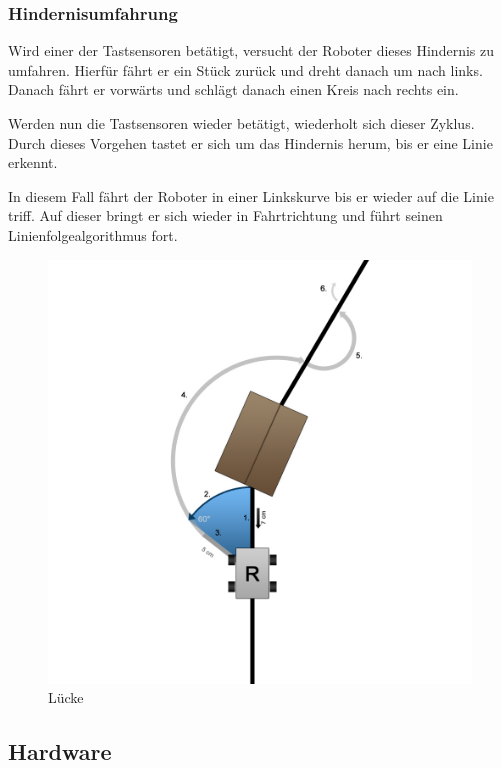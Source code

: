 \documentclass[a4paper]{article}
\begin{document}
\subsubsection{Hindernisumfahrung}
Wird einer der Tastsensoren betätigt, versucht der Roboter dieses
Hindernis zu umfahren. Hierfür fährt er ein Stück zurück und dreht danach
um nach links. Danach fährt er vorwärts und schlägt danach einen Kreis nach rechts
ein.

Werden nun die Tastsensoren wieder betätigt, wiederholt sich dieser
Zyklus. Durch dieses Vorgehen tastet er sich um das Hindernis herum, bis
er eine Linie erkennt.

In diesem Fall fährt der Roboter in einer Linkskurve bis er wieder auf
die Linie triff. Auf dieser bringt er sich wieder in Fahrtrichtung und
führt seinen Linienfolgealgorithmus fort.

\begin{figure}[ht]
  \centering
  \caption{Lücke}
  \includegraphics[scale=0.3]{hindernis.jpg}
\end{figure}

\newpage

\subsection{Hardware}
\end{document}
